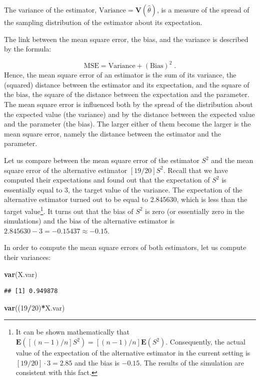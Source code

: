 \documentclass[
]{krantz}
\makeatletter
\newenvironment{Shaded}{\begin{snugshade}}{\end{snugshade}}
\newcommand{\DecValTok}[1]{\textcolor[rgb]{0.00,0.00,0.81}{#1}}
\newcommand{\KeywordTok}[1]{\textcolor[rgb]{0.13,0.29,0.53}{\textbf{#1}}}
\newcommand{\NormalTok}[1]{#1}
\newcommand{\OperatorTok}[1]{\textcolor[rgb]{0.81,0.36,0.00}{\textbf{#1}}}
\newcommand{\Expec}{\mathbf{E}}
\newcommand{\Var}{\mathbf{V}}
\newenvironment{kframe}{%
\medskip{}
\setlength{\fboxsep}{.8em}
 \def\at@end@of@kframe{}%
 \ifinner\ifhmode%
  \def\at@end@of@kframe{\end{minipage}}%
  \begin{minipage}{\columnwidth}%
 \fi\fi%
 \def\FrameCommand##1{\hskip\@totalleftmargin \hskip-\fboxsep
 \colorbox{shadecolor}{##1}\hskip-\fboxsep
     \hskip-\linewidth \hskip-\@totalleftmargin \hskip\columnwidth}%
 \MakeFramed {\advance\hsize-\width
   \@totalleftmargin\z@ \linewidth\hsize
   \@setminipage}}%
 {\par\unskip\endMakeFramed%
 \at@end@of@kframe}
\renewenvironment{Shaded}{\begin{kframe}}{\end{kframe}}
\theoremstyle{definition}
\theoremstyle{definition}
\theoremstyle{definition}
\theoremstyle{remark}
\makeatother
\begin{document}
The variance of the estimator, \(\mbox{Variance} = \Var(\hat \theta)\), is
a measure of the spread of the sampling distribution of the estimator
about its expectation.

The link between the mean square error, the bias, and the variance is
described by the formula:

\[\mbox{MSE} = \mbox{Variance} + (\mbox{Bias})^2\;.\] Hence, the mean
square error of an estimator is the sum of its variance, the (squared)
distance between the estimator and its expectation, and the square of
the bias, the square of the distance between the expectation and the
parameter. The mean square error is influenced both by the spread of the
distribution about the expected value (the variance) and by the distance
between the expected value and the parameter (the bias). The larger
either of them become the larger is the mean square error, namely the
distance between the estimator and the parameter.

Let us compare between the mean square error of the estimator \(S^2\) and
the mean square error of the alternative estimator \([19/20] S^2\). Recall
that we have computed their expectations and found out that the
expectation of \(S^2\) is essentially equal to 3, the target value of the
variance. The expectation of the alternative estimator turned out to be
equal to 2.845630, which is less than the target value\footnote{It can be shown mathematically that
  \(\Expec([(n-1)/n] S^2) = [(n-1)/n] \Expec(S^2)\). Consequently, the
  actual value of the expectation of the alternative estimator in the
  current setting is \([19/20]\cdot 3 = 2.85\) and the bias is \(-0.15\).
  The results of the simulation are consistent with this fact.}. It turns
out that the bias of \(S^2\) is zero (or essentially zero in the
simulations) and the bias of the alternative estimator is
\(2.845630 - 3 = -0.15437 \approx -0.15\).

In order to compute the mean square errors of both estimators, let us
compute their variances:

\begin{Shaded}
\begin{Highlighting}[]
\KeywordTok{var}\NormalTok{(X.var)}
\end{Highlighting}
\end{Shaded}

\begin{verbatim}
## [1] 0.949878
\end{verbatim}

\begin{Shaded}
\begin{Highlighting}[]
\KeywordTok{var}\NormalTok{((}\DecValTok{19}\OperatorTok{/}\DecValTok{20}\NormalTok{)}\OperatorTok{*}\NormalTok{X.var)}
\end{Highlighting}
\end{Shaded}
\end{document}
